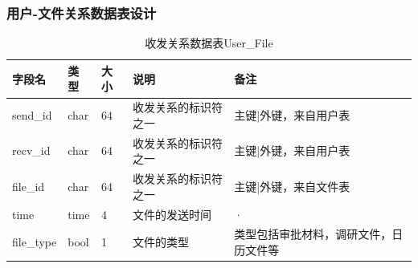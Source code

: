 \subsubsection{\color{red}用户-文件关系数据表设计}
\begin{table}[htbp]
\centering
\caption{\color{red} 收发关系数据表User\_File} \label{tab:order-database}
{\color{red}
\begin{tabular}{|p{4em}|p{2.5em}|p{2.5em}|p{10em}|p{11em}|}
    \hline
    字段名 & 类型 & 大小 & 说明 & 备注 \\
    \hline
    send\_id & char & 64 & 收发关系的标识符之一 & 主键|外键，来自用户表 \\
    \hline
    recv\_id & char & 64 & 收发关系的标识符之一 & 主键|外键，来自用户表 \\
    \hline
    file\_id & char & 64 & 收发关系的标识符之一 & 主键|外键，来自文件表 \\
    \hline
    time & time & 4 & 文件的发送时间 & · \\ 
    \hline
    file\_type& bool & 1 & 文件的类型 & 类型包括审批材料，调研文件，日历文件等\\ 
    \hline
\end{tabular}
}
\end{table}
\newpage
